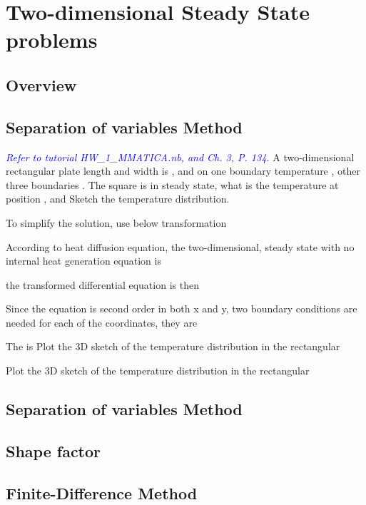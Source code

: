 \chapter{Two-dimensional Steady State problems}
\section{Overview}
\section{Separation of variables Method}
\begin{example}
\textcolor{blue} {\emph{Refer to tutorial HW\_1\_MMATICA.nb, and Ch. 3, P. 134.}}
A two-dimensional rectangular plate length and width is ,  and on one boundary temperature , other three boundaries . The square is in steady state, what is the temperature at position , and  Sketch the temperature distribution.
\end{example}
\begin{solution}
To simplify the solution, use below transformation

According to heat diffusion equation, the two-dimensional, steady state with no internal heat generation equation is 

the transformed differential equation is then

Since the equation is second order in both x and y, two boundary conditions are needed for each of the coordinates, they are

The is Plot the 3D sketch of the temperature distribution in the rectangular



Plot the 3D sketch of the temperature distribution in the rectangular
\end{solution}


\section{Separation of variables Method}
\section{Shape factor}
\section{Finite-Difference Method}


